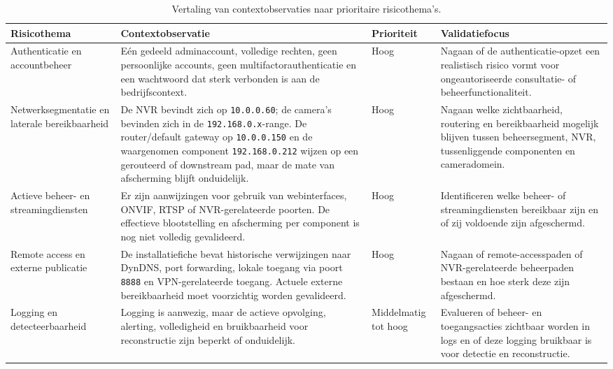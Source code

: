 \begin{table}[htbp]
    \centering
    \small
    \caption[Vertaling van contextobservaties naar prioritaire risicothema's]{Vertaling van contextobservaties naar prioritaire risicothema's.}
    \label{tab:prioritaire-risicothemas}
    {\setlength{\tabcolsep}{4pt}
        \begin{tabular}{p{}p{}p{}p{}}
            \hline
            \textbf{Risicothema} & \textbf{Contextobservatie} & \textbf{Prioriteit} & \textbf{Validatiefocus} \\
            \hline
            Authenticatie en accountbeheer &
            Eén gedeeld adminaccount, volledige rechten, geen persoonlijke accounts, geen multifactorauthenticatie en een wachtwoord dat sterk verbonden is aan de bedrijfscontext. &
            Hoog &
            Nagaan of de authenticatie-opzet een realistisch risico vormt voor ongeautoriseerde consultatie- of beheerfunctionaliteit. \\
            \hline
            Netwerk\-segmentatie en laterale bereikbaarheid &
            De NVR bevindt zich op \texttt{10.0.0.60}; de camera's bevinden zich in de \texttt{192.168.0.x}-range. De router/default gateway op \texttt{10.0.0.150} en de waargenomen component \texttt{192.168.0.212} wijzen op een gerouteerd of downstream pad, maar de mate van afscherming blijft onduidelijk. &
            Hoog &
            Nagaan welke zichtbaarheid, routering en bereikbaarheid mogelijk blijven tussen beheersegment, NVR, tussenliggende componenten en cameradomein. \\
            \hline
            Actieve beheer- en streamingdiensten &
            Er zijn aanwijzingen voor gebruik van webinterfaces, ONVIF, RTSP of NVR-gerelateerde poorten. De effectieve blootstelling en afscherming per component is nog niet volledig gevalideerd. &
            Hoog &
            Identificeren welke beheer- of streamingdiensten bereikbaar zijn en of zij voldoende zijn afgeschermd. \\
            \hline
            Remote access en externe publicatie &
            De installatiefiche bevat historische verwijzingen naar DynDNS, port forwarding, lokale toegang via poort \texttt{8888} en VPN-gerelateerde toegang. Actuele externe bereikbaarheid moet voorzichtig worden gevalideerd. &
            Hoog &
            Nagaan of remote-accesspaden of NVR-gerelateerde beheerpaden bestaan en hoe sterk deze zijn afgeschermd. \\
            \hline
            Logging en detecteerbaarheid &
            Logging is aanwezig, maar de actieve opvolging, alerting, volledigheid en bruikbaarheid voor reconstructie zijn beperkt of onduidelijk. &
            Middelmatig tot hoog &
            Evalueren of beheer- en toegangsacties zichtbaar worden in logs en of deze logging bruikbaar is voor detectie en reconstructie. \\
            \hline
        \end{tabular}
    }
\end{table}

